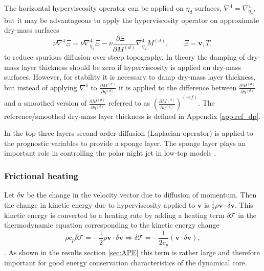\documentclass{agujournal}
\begin{document}
{%

The horizontal hyperviscosity operator can be applied on $\eta_d$-surfaces, $\nabla^4=\nabla^4_{\eta_d}$, but it may be advantageous to apply the hyperviscosity operator on approximate dry-mass surfaces
\begin{equation}
\nu \nabla^4 \Xi =\nu \nabla^4_{\eta_d}\Xi -\nu \frac{\partial \Xi\quad }{\partial M^{(d)}} \nabla^4_{\eta_d}M^{(d)},\qquad \Xi=\mathbf{v}, T,
\end{equation}
\citep[p.58 in ][]{CAM5} to reduce spurious diffusion over steep topography. In theory the damping of dry-mass layer thickness should be zero if hyperviscosity is applied on dry-mass surfaces. However, for stability it is necessary to damp dry-mass layer thickness, but instead of applying $\nabla^4$ to $\frac{\partial M^{(d)}}{\partial \eta^{(d)}}$ it is applied to the difference between $\frac{\partial M^{(d)}}{\partial \eta^{(d)}}$ and a smoothed version of $\frac{\partial M^{(d)}}{\partial \eta^{(d)}}$ referred to as $\left( \frac{\partial M^{(d)}}{\partial \eta^{(d)}}\right)^{(ref)}$. The reference/smoothed dry-mass layer thickness is defined in Appendix \ref{app:ref_dp}. 

In the top three layers second-order diffusion (Laplacian operator) is applied to the prognostic variables to provide a sponge layer. The sponge layer plays an important role in controlling the polar night jet in low-top models \citep[see, e.g., ][]{L2011IJHPC}.

%
\subsubsection{Frictional heating}\label{sec:frictional_heating}
Let $\delta \mathbf{v}$ be the change in the velocity vector due to diffusion of momentum. Then the change in kinetic energy due to hyperviscosity applied to $\mathbf{v}$ is $\frac{1}{2}\rho \mathbf{v} \cdot \delta \mathbf{v}$. This kinetic energy is converted to a heating rate by adding a heating term $\delta \mathcal{T}$ in the thermodynamic equation corresponding to the kinetic energy change
\begin{equation}
\rho c_p \delta \mathcal{T}=-\frac{1}{2}\rho \mathbf{v} \cdot \delta \mathbf{v} \Rightarrow
 \delta \mathcal{T}=-\frac{1}{2 c_p}\left(\mathbf{v}\cdot \delta \mathbf{v}\right),\label{eq:tcp}
\end{equation}
\citep[p.71 in ][]{CAM5}. As shown in the results section \ref{sec:APE} this term is rather large and therefore important for good energy conservation characteristics of the dynamical core.

}
\end{document}
